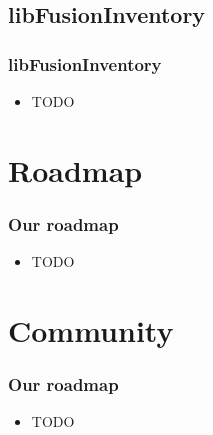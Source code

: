 \documentclass{beamer}
\begin{document}
\subsection{libFusionInventory}
\begin{frame}
\frametitle{libFusionInventory}
%
\begin{itemize}
%
\item TODO
%
\end{itemize}
\end{frame}
%

\section{Roadmap}
%
\begin{frame}
\frametitle{Our roadmap}
%
\begin{itemize}
%
\item TODO
%
\end{itemize}
\end{frame}

\section{Community}
%
\begin{frame}
\frametitle{Our roadmap}
%
\begin{itemize}
%
\item TODO
%
\end{itemize}
\end{frame}
\end{document}
